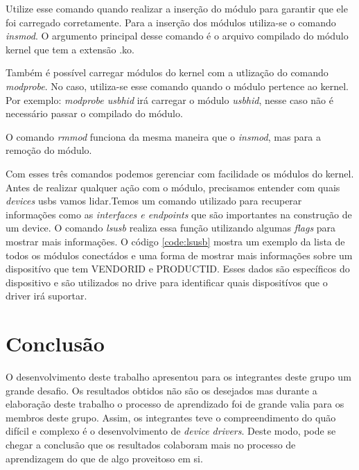 \lstset{style=terminal}


Utilize esse comando quando realizar a inserção do módulo para garantir que ele foi carregado
corretamente. Para a inserção dos módulos utiliza-se o comando \textit{insmod}. O argumento principal desse
comando é o arquivo compilado do módulo kernel que tem a extensão .ko.

\lstset{style=terminal}


Também é possível carregar módulos do kernel com a utlização do comando \textit{modprobe}. No caso, utiliza-se
esse comando quando o módulo pertence ao kernel. Por exemplo: \textit{modprobe usbhid} irá carregar o módulo
\textit{usbhid}, nesse caso não é necessário passar o compilado do módulo.

O comando \textit{rmmod} funciona da mesma maneira que o \textit{insmod}, mas para a remoção do módulo.

\lstset{style=terminal}


Com esses três comandos podemos gerenciar com facilidade os módulos do kernel.
Antes de realizar qualquer ação com o módulo, precisamos entender com quais \textit{devices} usbs vamos
lidar.Temos um comando utilizado para recuperar
informações como as \textit{interfaces e endpoints} que são importantes na construção de um device.
O comando \textit{lsusb} realiza essa função utilizando algumas \textit{flags} para mostrar mais informações.
O código \ref{code:lsusb} mostra um exemplo da lista de todos os módulos conectádos e uma
forma de mostrar mais informações sobre um dispositívo que tem VENDORID e PRODUCTID. Esses
dados são específicos do dispositivo e são utilizados no drive para identificar quais
dispositívos que o driver irá suportar.

\lstset{style=terminal}





\section{Conclusão}
O desenvolvimento deste trabalho apresentou para os integrantes deste grupo um grande
desafio. Os resultados obtidos não são os desejados mas durante a elaboração deste trabalho
o processo de aprendizado foi de grande valia para os membros deste grupo. Assim, os
integrantes teve o compreendimento do quão difícil e complexo é o desenvolvimento de
\textit{device drivers}. Deste modo, pode se chegar a conclusão que os resultados colaboram mais
no processo de aprendizagem do que de algo proveitoso em si.


